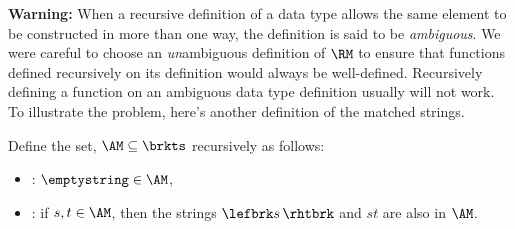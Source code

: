 \iffalse

The \term{depth} of a matched string is defined recursively as follows
\begin{definition}
The \emph{depth} $d(s)$ of a string $s \in\RM$ is defined
recursively by the rules:
\begin{itemize}
\item $d(\emptystring) \eqdef\  0.$
\item $d(\lefbrk s\,\rhtbrk t)
    \eqdef\ \max \set{d(s) + 1, d(t)}$
\end{itemize}
\end{definition}
\fi

\textbf{Warning:}%
When a recursive definition of a data type allows
the same element to be constructed in more than one way, the
definition is said to be \emph{ambiguous}.  We were careful to choose
an \emph{un}ambiguous definition of $\RM$ to ensure that functions
defined recursively on its definition would always be well-defined.
Recursively defining a function on an ambiguous data type
definition usually will not work.  To illustrate the problem, here's
another definition of the matched strings.

\iffalse Recursive definitions of tagged data types, where the tag
uniquely determines the rule used to construct an element, are guaranteed
to be unambiguous.
\fi

\begin{definition}\label{AM_def}
Define the set, $\AM \subseteq \brkts$ recursively as follows:
\begin{itemize}

\item {}: $\emptystring \in \AM$,

\item {}: if $s,t \in \AM$, then
  the strings $\lefbrk s\, \rhtbrk$ and $st$ are also in $\AM$.
\end{itemize}
\end{definition}


